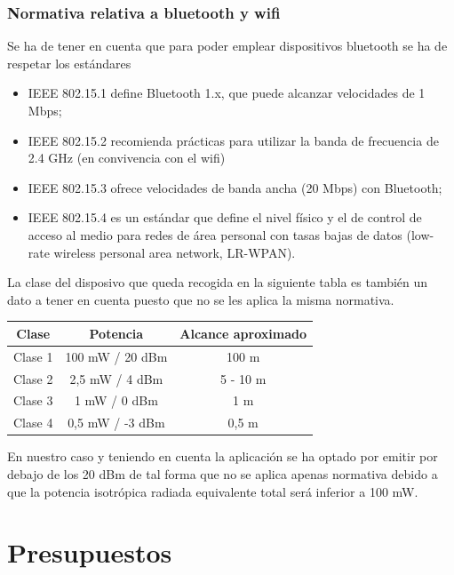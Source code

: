 \documentclass[paper=a4, fontsize=11pt,twoside]{scrartcl}	%
\begin{document}
        \subsubsection{Normativa relativa a bluetooth y wifi}
            Se ha de tener en cuenta que para poder emplear dispositivos bluetooth se ha de respetar los estándares
            \begin{itemize}
                \item IEEE 802.15.1 define Bluetooth 1.x, que puede alcanzar velocidades de 1 Mbps;
                \item IEEE 802.15.2 recomienda prácticas para utilizar la banda de frecuencia de 2.4 GHz (en convivencia con el wifi)
                \item IEEE 802.15.3 ofrece velocidades de banda ancha (20 Mbps) con Bluetooth;
                \item IEEE 802.15.4 es un estándar que define el nivel físico y el de control de acceso al medio 
                para redes de área personal con tasas bajas de datos (low-rate wireless personal area network, LR-WPAN).
            \end{itemize}
            La clase del disposivo que queda recogida en la siguiente tabla es también un dato a tener en cuenta puesto que no 
            se les aplica la misma normativa.
            \begin{center}
                \begin{tabular}{||c | c |c ||} 
                \hline
                Clase & Potencia  & Alcance aproximado\\ [0.5ex] 
                \hline\hline
                Clase 1 & 100 mW / 20 dBm & 100 m \\ 
                Clase 2 & 2,5 mW / 4 dBm & 5 - 10 m \\ 
                Clase 3 & 1 mW / 0 dBm & 1 m \\ 
                Clase 4 & 0,5 mW / -3 dBm & 0,5 m \\ 
                \hline
                \end{tabular}
            \end{center}
            En nuestro caso y teniendo en cuenta la aplicación se ha optado por emitir por debajo de los 20 dBm de tal forma
            que no se aplica apenas normativa debido a que la potencia isotrópica radiada equivalente total será
            inferior a 100 mW.
\section{Presupuestos}
\end{document}
